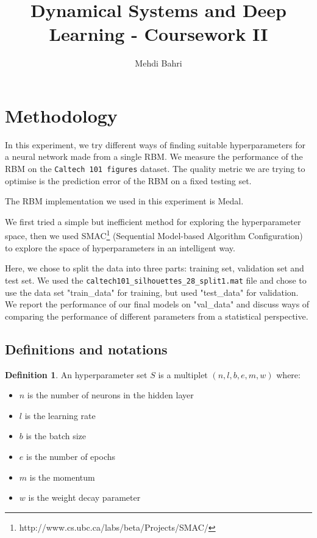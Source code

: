 \documentclass[10pt,a4paper, twocolumn]{article}
\author{Mehdi Bahri}
\title{Dynamical Systems and Deep Learning - Coursework II}
\theoremstyle{definition}
\newtheorem{defn}{Definition}
\begin{document}
\maketitle
\section{Methodology}
In this experiment, we try different ways of finding suitable hyperparameters for a neural network made from a single RBM. We measure the performance of the RBM on the \texttt{Caltech 101 figures} dataset. The quality metric we are trying to optimise is the prediction error of the RBM on a fixed testing set.

\vspace{1em}

The RBM implementation we used in this experiment is Medal.

\vspace{1em}

We first tried a simple but inefficient method for exploring the hyperparameter space, then we used SMAC\footnote{http://www.cs.ubc.ca/labs/beta/Projects/SMAC/} (Sequential Model-based Algorithm Configuration) to explore the space of hyperparameters in an intelligent way.

\vspace{1em}

Here, we chose to split the data into three parts: training set, validation set and test set. We used the \texttt{caltech101\_silhouettes\_28\_split1.mat} file and chose to use the data set "train\_data" for training, but used "test\_data" for validation. We report the performance of our final models on "val\_data" and discuss ways of comparing the performance of different parameters from a statistical perspective.

\subsection{Definitions and notations}

\begin{defn}
An hyperparameter set $S$ is a multiplet $(n, l, b, e, m, w)$ where:
\begin{itemize}
\item $n$ is the number of neurons in the hidden layer
\item $l$ is the learning rate
\item $b$ is the batch size
\item $e$ is the number of epochs
\item $m$ is the momentum
\item $w$ is the weight decay parameter
\end{itemize}
\end{defn}
\end{document}
